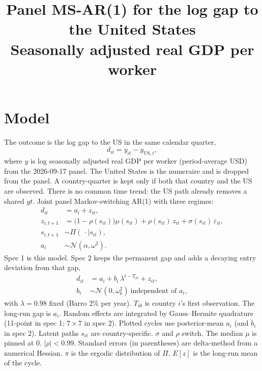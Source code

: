 \documentclass[11pt]{article}
\title{Panel MS-AR(1) for the log gap to the United States\\[0.4em]\large Seasonally adjusted real GDP per worker}
\author{}
\date{}
\begin{document}
\maketitle
\section{Model}
The outcome is the log gap to the US in the same calendar quarter,
\begin{equation}
d_{it}=y_{it}-y_{\mathrm{US},t},
\end{equation}
where $y$ is log seasonally adjusted real GDP per worker (period-average USD) from the 2026-09-17 panel. The United States is the numeraire and is dropped from the panel. A country-quarter is kept only if both that country and the US are observed. There is no common time trend: the US path already removes a shared $gt$.
Joint panel Markov-switching AR(1) with three regimes:
\begin{align}
d_{it} &= a_i + z_{it}, \\
z_{i,t+1} &= \bigl(1-\rho(s_{it})\bigr)\mu(s_{it}) + \rho(s_{it})\, z_{it} + \sigma(s_{it})\,\varepsilon_{it}, \\
s_{i,t+1} &\sim \Pi(\,\cdot\mid s_{it}), \\
a_i &\sim \mathcal{N}(\alpha,\omega^2).
\end{align}
Spec 1 is this model. Spec 2 keeps the permanent gap and adds a decaying entry deviation from that gap,
\begin{align}
d_{it} &= a_i + b_i\,\lambda^{t-T_{i0}} + z_{it}, \\
b_i &\sim \mathcal{N}(0,\omega_b^2) \ \text{independent of } a_i,
\end{align}
with $\lambda=0.98$ fixed (Barro 2\% per year). $T_{i0}$ is country $i$'s first observation. The long-run gap is $a_i$. Random effects are integrated by Gauss--Hermite quadrature (11-point in spec 1; $7\times 7$ in spec 2). Plotted cycles use posterior-mean $a_i$ (and $b_i$ in spec 2). Latent paths $s_{it}$ are country-specific. $\sigma$ and $\rho$ switch. The median $\mu$ is pinned at 0. $|\rho|<0.99$.
Standard errors (in parentheses) are delta-method from a numerical Hessian. $\pi$ is the ergodic distribution of $\Pi$. $E[z]$ is the long-run mean of the cycle.
\clearpage
\end{document}
